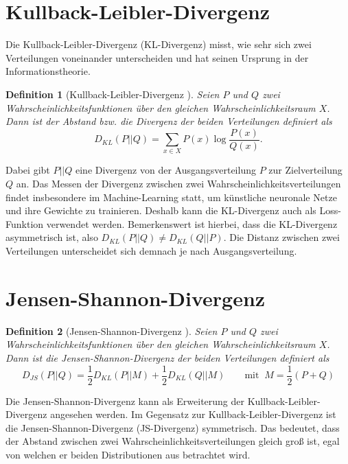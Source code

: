 \documentclass{hsflensburg}
\newtheorem{definition}{Definition}
\begin{document}
  \section{Kullback-Leibler-Divergenz}
  Die Kullback-Leibler-Divergenz (KL-Divergenz) misst, wie sehr sich zwei
  Verteilungen voneinander unterscheiden und hat seinen Ursprung in der
  Informationstheorie. 
  \begin{definition}[Kullback-Leibler-Divergenz \cite{arjovsky2017wasserstein}]
    Seien $P$ und $Q$ zwei Wahrscheinlichkeitsfunktionen über den gleichen
    Wahrscheinlichkeitsraum $X$. Dann ist der Abstand bzw. die Divergenz der
    beiden Verteilungen definiert als
    \[
      D_{KL}(P \lvert\lvert Q) = \sum_{x \in X} P(x) \log \frac{P(x)}{Q(x)}.
    \]
  \end{definition}
  Dabei gibt $P \lvert\lvert Q$ eine Divergenz von der Ausgangsverteilung $P$
  zur Zielverteilung $Q$ an. Das Messen der Divergenz zwischen zwei
  Wahrscheinlichkeitsverteilungen findet insbesondere im Machine-Learning statt,
  um künstliche neuronale Netze und ihre Gewichte zu trainieren. Deshalb kann
  die KL-Divergenz auch als Loss-Funktion verwendet werden. Bemerkenswert ist
  hierbei, dass die KL-Divergenz asymmetrisch ist, also $D_{KL}(P \lvert\lvert
  Q) \neq D_{KL}(Q \lvert\lvert P)$. Die Distanz zwischen zwei Verteilungen
  unterscheidet sich demnach je nach Ausgangsverteilung.

  \section{Jensen-Shannon-Divergenz}
  \begin{definition}[Jensen-Shannon-Divergenz \cite{arjovsky2017wasserstein}]
    Seien $P$ und $Q$ zwei Wahr\-schein\-lichkeitsfunktionen über den gleichen
    Wahrscheinlichkeitsraum $X$. Dann ist die Jensen-Shannon-Divergenz der
    beiden Verteilungen definiert als
    \[
      D_{JS}(P \lvert\lvert Q) = \frac{1}{2} D_{KL}(P \lvert\lvert M) + \frac{1}{2} D_{KL}(Q \lvert\lvert M) \quad\quad \text{mit} \;\; M = \frac{1}{2}(P + Q)
    \]
  \end{definition}
  Die Jensen-Shannon-Divergenz kann als Erweiterung der
  Kullback-Leibler-Divergenz angesehen werden. Im Gegensatz zur
  Kullback-Leibler-Divergenz ist die Jensen-Shannon-Divergenz (JS-Divergenz)
  symmetrisch. Das bedeutet, dass der Abstand zwischen zwei
  Wahrscheinlichkeitsverteilungen gleich groß ist, egal von welchen er beiden
  Distributionen aus betrachtet wird.
\end{document}
